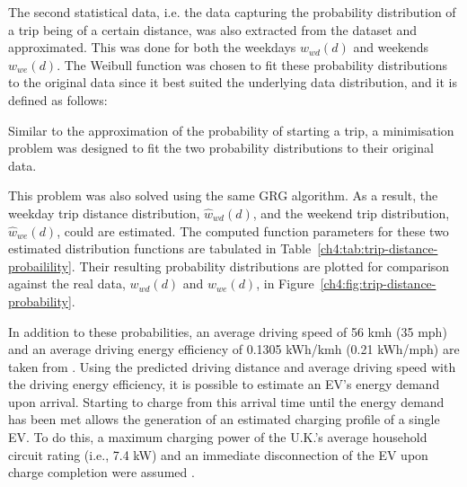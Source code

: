



The second statistical data, i.e. the data capturing the probability distribution of a trip being of a certain distance, was also extracted from the dataset and approximated.
This was done for both the weekdays $w_{wd}(d)$ and weekends $w_{we}(d)$.
The Weibull function was chosen to fit these probability distributions to the original data since it best suited the underlying data distribution, and it is defined as follows:



Similar to the approximation of the probability of starting a trip, a minimisation problem was designed to fit the two probability distributions to their original data.



This problem was also solved using the same GRG algorithm.
As a result, the weekday trip distance distribution, $\hat{w}_{wd}(d)$, and the weekend trip distribution, $\hat{w}_{we}(d)$, could are estimated.
The computed function parameters for these two estimated distribution functions are tabulated in Table~\ref{ch4:tab:trip-distance-probailility}.
Their resulting probability distributions are plotted for comparison against the real data, $w_{wd}(d)$ and $w_{we}(d)$, in Figure~\ref{ch4:fig:trip-distance-probability}.




 
In addition to these probabilities, an average driving speed of 56 kmh (35 mph) and an average driving energy efficiency of 0.1305 kWh/kmh (0.21 kWh/mph) are taken from \cite{UKGovernmentDigitalService2013}.
Using the predicted driving distance and average driving speed with the driving energy efficiency, it is possible to estimate an EV's energy demand upon arrival.
Starting to charge from this arrival time until the energy demand has been met allows the generation of an estimated charging profile of a single EV.
To do this, a maximum charging power of the U.K.'s average household circuit rating (i.e., 7.4 kW) and an immediate disconnection of the EV upon charge completion were assumed \cite{EVHomeCharging}.



